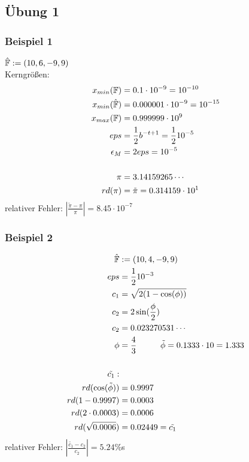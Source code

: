 \subsection{Übung 1}
\subsubsection{Beispiel 1}

$ \hat{\mathbb{F}} := (10,6,-9,9) $ \\
Kerngrößen:\\
\begin{align*}
 x_{min}(\mathbb{F}) &= 0.1 \cdot 10^{-9} = 10^{-10}\\
 x_{min}(\hat{\mathbb{F}}) &= 0.000001 \cdot 10^{-9} = 10^{-15}  \\
 x_{max}(\mathbb{F}) &= 0.999999 \cdot 10^{9}  \\
 eps &= \frac{1}{2} b^{-t + 1} = \frac{1}{2} 10^{-5}  \\
 \epsilon_{M} &= 2eps = 10^{-5}  \\
\\
 \pi &= 3.14159265\cdots  \\
 rd(\pi) &= \tilde{\pi} = 0.314159 \cdot 10^1  \\
\end{align*}
relativer Fehler: $ | \frac{\tilde{\pi} - \pi}{\pi} | = 8.45 \cdot 10^{-7} $

\subsubsection{Beispiel 2}
\begin{align*}
 \hat{\mathbb{F}} &:= (10,4,-9,9)  \\
 eps &= \frac{1}{2} 10^{-3}  \\
 c_1 &= \sqrt{2(1-\cos(\phi))}  \\
 c_2 &= 2 \sin(\frac{\phi}{2})  \\
 c_2 &= 0.023270531\cdots  \\
 \phi&= \frac{4}{3} \hspace{1cm} \tilde{\phi} = 0.1333 \cdot 10 = 1.333 \\
\\
 \tilde{c_1}:  \\
 rd({\cos}(\tilde{\phi})) &= 0.9997  \\
 rd(1 - 0.9997) &= 0.0003  \\
 rd(2 \cdot 0.0003) &= 0.0006  \\
 rd(\sqrt{0.0006}) &= 0.02449 = \tilde{c_1}  \\
\end{align*}
relativer Fehler: $ | \frac{\tilde{c_1} - c_2}{c_2} | = 5.24\% $s \\

